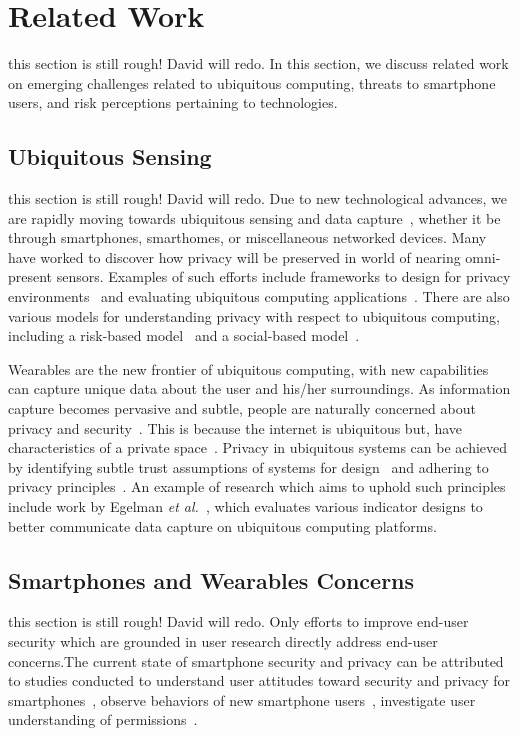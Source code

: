 \documentclass{acm_proc_article-sp}
\def\etal{{\it et al.~}}
\begin{document}
\section{Related Work}
{\color{red} this section is still rough! David will redo.} 
In this section, we discuss related work on emerging challenges related to ubiquitous computing, threats to smartphone users, and risk perceptions pertaining to technologies.

\subsection{Ubiquitous Sensing}
{\color{red} this section is still rough! David will redo.} 
Due to new technological advances, we are rapidly moving towards ubiquitous sensing and data capture~\cite{abowd2000charting}, whether it be through smartphones, smarthomes, or miscellaneous networked devices. Many have worked to discover how privacy will be preserved in world of nearing omni-present sensors. Examples of such efforts include frameworks to design for privacy environments~\cite{bellotti1993design} and evaluating ubiquitous computing applications~\cite{scholtz2004toward}. There are also various models for understanding privacy with respect to ubiquitous computing, including a risk-based model~\cite{hong2004privacy} and a social-based model~\cite{jiang2002approximate}. 

Wearables are the new frontier of ubiquitous computing, with new capabilities can capture unique data about the user and his/her surroundings. As information capture becomes pervasive and subtle, people are naturally concerned about privacy and security~\cite{palen2003unpacking}. This is because the internet is ubiquitous but, have characteristics of a private space~\cite{camp2000internet}. Privacy in ubiquitous systems can be achieved by  identifying subtle trust assumptions of systems for design~\cite{camp2003designing} and adhering to privacy principles~\cite{langheinrich2001privacy}. An example of research which aims to uphold such principles include work by Egelman \etal , which evaluates various indicator designs to better communicate data capture on ubiquitous computing platforms. 

\subsection{Smartphones and Wearables Concerns}
{\color{red} this section is still rough! David will redo.} 
Only efforts to improve end-user security which are grounded in user research directly address end-user concerns.The current state of smartphone security and privacy can be attributed to studies conducted to understand user attitudes toward security and privacy for smartphones~\cite{chin2012measuring}, observe behaviors of new smartphone users~\cite{palen2000going}, investigate user understanding of permissions~\cite{felt2012android}. 
\end{document}
